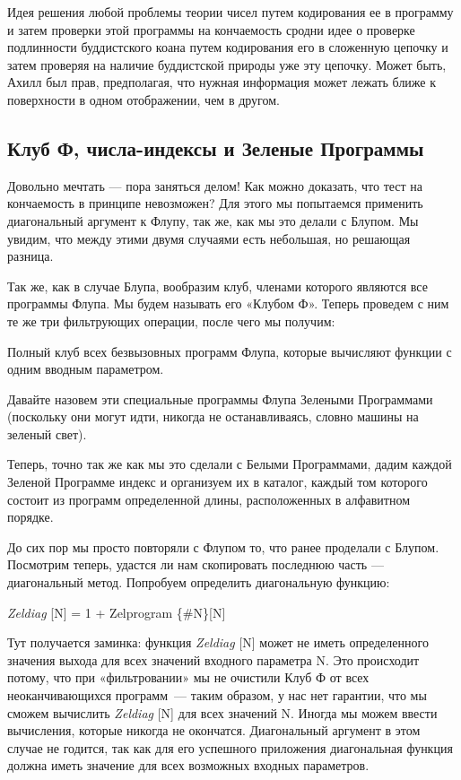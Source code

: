 \documentclass[../main.tex]{subfiles}
\begin{document}
Идея решения любой проблемы теории чисел путем кодирования ее в программу и затем проверки этой программы на кончаемость сродни идее о проверке подлинности буддистского коана путем кодирования его в сложенную цепочку и затем проверяя на наличие буддистской природы уже эту цепочку. Может быть, Ахилл был прав, предполагая, что нужная информация может лежать ближе к поверхности в одном отображении, чем в другом.


\subsection{Клуб Ф, числа-индексы и Зеленые Программы}

Довольно мечтать --- пора заняться делом! Как можно доказать, что тест на кончаемость в принципе невозможен? Для этого мы попытаемся применить диагональный аргумент к Флупу, так же, как мы это делали с Блупом. Мы увидим, что между этими двумя случаями есть небольшая, но решающая разница.

Так же, как в случае Блупа, вообразим клуб, членами которого являются все программы Флупа. Мы будем называть его «Клубом Ф». Теперь проведем с ним те же три фильтрующих операции, после чего мы получим:

Полный клуб всех безвызовных программ Флупа, которые вычисляют функции с одним вводным параметром.

Давайте назовем эти специальные программы Флупа Зелеными Программами (поскольку они могут идти, никогда не останавливаясь, словно машины на зеленый свет).

Теперь, точно так же как мы это сделали с Белыми Программами, дадим каждой Зеленой Программе индекс и организуем их в каталог, каждый том которого состоит из программ определенной длины, расположенных в алфавитном порядке.

До сих пор мы просто повторяли с Флупом то, что ранее проделали с Блупом. Посмотрим теперь, удастся ли нам скопировать последнюю часть --- диагональный метод. Попробуем определить диагональную функцию:

\emph{Zeldiag} {[}N{]} = 1 + Zelprogram \{\#N\}{[}N{]}

Тут получается заминка: функция \emph{Zeldiag} {[}N{]} может не иметь определенного значения выхода для всех значений входного параметра N. Это происходит потому, что при «фильтровании» мы не очистили Клуб Ф от всех неоканчивающихся программ~--- таким образом, у нас нет гарантии, что мы сможем вычислить \emph{Zeldiag} {[}N{]} для всех значений N. Иногда мы можем ввести вычисления, которые никогда не окончатся. Диагональный аргумент в этом случае не годится, так как для его успешного приложения диагональная функция должна иметь значение для всех возможных входных параметров.
\end{document}
